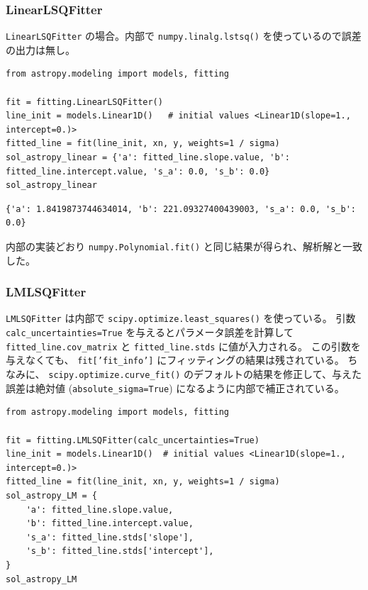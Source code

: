 \documentclass[a4paper, 8pt, notitlepage, uplatex, dvipdfmx]{jsarticle}
\begin{document}
\subsubsection{LinearLSQFitter}
\label{sec:orgb14cfab}
\texttt{LinearLSQFitter} の場合。内部で \texttt{numpy.linalg.lstsq()} を使っているので誤差の出力は無し。
\begin{verbatim}
from astropy.modeling import models, fitting

fit = fitting.LinearLSQFitter()
line_init = models.Linear1D()   # initial values <Linear1D(slope=1., intercept=0.)>
fitted_line = fit(line_init, xn, y, weights=1 / sigma)
sol_astropy_linear = {'a': fitted_line.slope.value, 'b': fitted_line.intercept.value, 's_a': 0.0, 's_b': 0.0}
sol_astropy_linear
\end{verbatim}

\label{}
\begin{verbatim}
{'a': 1.8419873744634014, 'b': 221.09327400439003, 's_a': 0.0, 's_b': 0.0}
\end{verbatim}

内部の実装どおり \texttt{numpy.Polynomial.fit()} と同じ結果が得られ、解析解と一致した。
\subsubsection{LMLSQFitter}
\label{sec:orgdd7d47d}
\texttt{LMLSQFitter} は内部で \texttt{scipy.optimize.least\_squares()} を使っている。
引数 \texttt{calc\_uncertainties=True} を与えるとパラメータ誤差を計算して \texttt{fitted\_line.cov\_matrix} と \texttt{fitted\_line.stds} に値が入力される。
この引数を与えなくても、 \texttt{fit['fit\_info']} にフィッティングの結果は残されている。
ちなみに、 \texttt{scipy.optimize.curve\_fit()} のデフォルトの結果を修正して、与えた誤差は絶対値 (\texttt{absolute\_sigma=True}) になるように内部で補正されている。

\begin{verbatim}
from astropy.modeling import models, fitting

fit = fitting.LMLSQFitter(calc_uncertainties=True)
line_init = models.Linear1D()  # initial values <Linear1D(slope=1., intercept=0.)>
fitted_line = fit(line_init, xn, y, weights=1 / sigma)
sol_astropy_LM = {
    'a': fitted_line.slope.value,
    'b': fitted_line.intercept.value,
    's_a': fitted_line.stds['slope'],
    's_b': fitted_line.stds['intercept'],
}
sol_astropy_LM
\end{verbatim}
\end{document}
